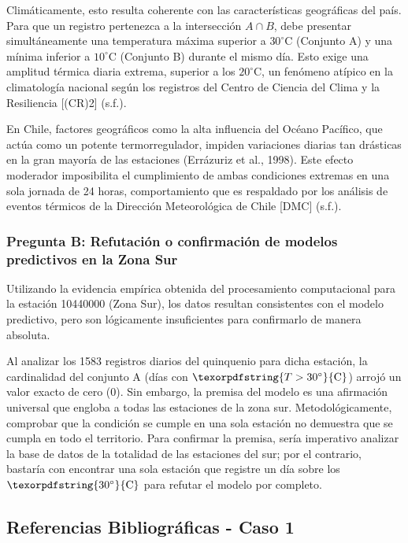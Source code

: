 \documentclass[12pt]{article}
\begin{document}
\newpage

Climáticamente, esto resulta coherente con las características geográficas del país. Para que un registro pertenezca a la intersección $A \cap B$, debe presentar simultáneamente una temperatura máxima superior a \texorpdfstring{$30^{\circ}\text{C}$}{30 C} (Conjunto A) y una mínima inferior a \texorpdfstring{$10^{\circ}\text{C}$}{10 C} (Conjunto B) durante el mismo día. Esto exige una amplitud térmica diaria extrema, superior a los \texorpdfstring{$20^{\circ}\text{C}$}{20 C}, un fenómeno atípico en la climatología nacional según los registros del Centro de Ciencia del Clima y la Resiliencia [(CR)2] (s.f.).

En Chile, factores geográficos como la alta influencia del Océano Pacífico, que actúa como un potente termorregulador, impiden variaciones diarias tan drásticas en la gran mayoría de las estaciones (Errázuriz et al., 1998). Este efecto moderador imposibilita el cumplimiento de ambas condiciones extremas en una sola jornada de 24 horas, comportamiento que es respaldado por los análisis de eventos térmicos de la Dirección Meteorológica de Chile [DMC] (s.f.).

\subsubsection{Pregunta B: Refutación o confirmación de modelos predictivos en la Zona Sur}

Utilizando la evidencia empírica obtenida del procesamiento computacional para la estación 10440000 (Zona Sur), los datos resultan consistentes con el modelo predictivo, pero son lógicamente insuficientes para confirmarlo de manera absoluta. 

Al analizar los 1583 registros diarios del quinquenio para dicha estación, la cardinalidad del conjunto A (días con $\texorpdfstring{T > 30^\circ}{\text{C}}$) arrojó un valor exacto de cero (0). Sin embargo, la premisa del modelo es una afirmación universal que engloba a todas las estaciones de la zona sur. Metodológicamente, comprobar que la condición se cumple en una sola estación no demuestra que se cumpla en todo el territorio. Para confirmar la premisa, sería imperativo analizar la base de datos de la totalidad de las estaciones del sur; por el contrario, bastaría con encontrar una sola estación que registre un día sobre los $\texorpdfstring{30^\circ}{\text{C}}$ para refutar el modelo por completo.

\newpage

\subsection{Referencias Bibliográficas - Caso 1}
\end{document}
